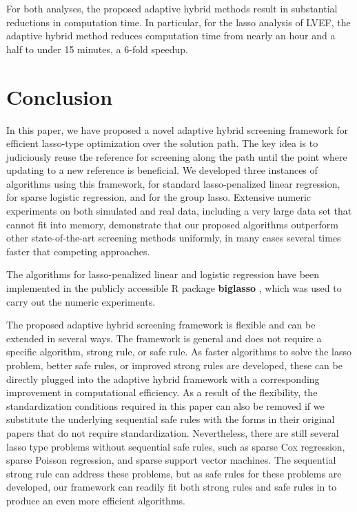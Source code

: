 For both analyses, the proposed adaptive hybrid methods result in substantial reductions in computation time. In particular, for the lasso analysis of LVEF, the adaptive hybrid method reduces computation time from nearly an hour and a half to under 15 minutes, a 6-fold speedup.

\section{Conclusion}
\label{sec:6}

In this paper, we have proposed a novel adaptive hybrid screening framework for efficient lasso-type optimization over the solution path. The key idea is to judiciously reuse the reference for screening along the path until the point where updating to a new reference is beneficial. We developed three instances of algorithms using this framework, for standard lasso-penalized linear regression, for sparse logistic regression, and for the group lasso. Extensive numeric experiments on both simulated and real data, including a very large data set that cannot fit into memory, demonstrate that our proposed algorithms outperform other state-of-the-art screening methods uniformly, in many cases several times faster that competing approaches.

The algorithms for lasso-penalized linear and logistic regression have been implemented in the publicly accessible R package \textbf{biglasso} \citep{zeng2017biglasso}, which was used to carry out the numeric experiments.

The proposed adaptive hybrid screening framework is flexible and can be extended in several ways. The framework is general and does not require a specific algorithm, strong rule, or safe rule. As faster algorithms to solve the lasso problem, better safe rules, or improved strong rules are developed, these can be directly plugged into the adaptive hybrid framework with a corresponding improvement in computational efficiency. As a result of the flexibility, the standardization conditions required in this paper can also be removed if we substitute the underlying sequential safe rules with the forms in their original papers that do not require standardization. Nevertheless, there are still several lasso type problems without sequential safe rules, such as sparse Cox regression, sparse Poisson regression, and sparse support vector machines. The sequential strong rule can address these problems, but as safe rules for these problems are developed, our framework can readily fit both strong rules and safe rules in to produce an even more efficient algorithms.

